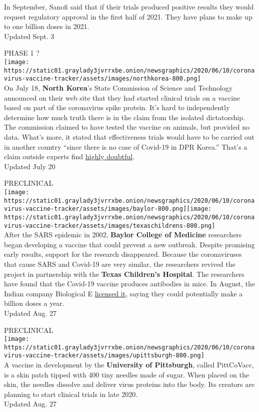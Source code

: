 In September, Sanofi said that if their trials produced positive results
they would request regulatory approval in the first half of 2021. They
have plans to make up to one billion doses in 2021.\\
Updated Sept. 3

PHASE 1 ?\\
\texttt{[image: https://static01.graylady3jvrrxbe.onion/newsgraphics/2020/06/10/coronavirus-vaccine-tracker/assets/images/northkorea-800.png]}\\
On July 18, \textbf{North Korea}'s State Commission of Science and
Technology announced on their web site that they had started clinical
trials on a vaccine based on part of the coronavirus spike protein. It's
hard to independently determine how much truth there is in the claim
from the isolated dictatorship. The commission claimed to have tested
the vaccine on animals, but provided no data. What's more, it stated
that effectiveness trials would have to be carried out in another
country ``since there is no case of Covid-19 in DPR Korea.'' That's a
claim outside experts find
\href{https://www.nytimes3xbfgragh.onion/2020/03/31/world/asia/north-korea-coronavirus.html}{highly
doubtful}.\\
Updated July 20

PRECLINICAL\\
\texttt{[image: https://static01.graylady3jvrrxbe.onion/newsgraphics/2020/06/10/coronavirus-vaccine-tracker/assets/images/baylor-800.png]}\texttt{[image: https://static01.graylady3jvrrxbe.onion/newsgraphics/2020/06/10/coronavirus-vaccine-tracker/assets/images/texaschildrens-800.png]}\\
After the SARS epidemic in 2002, \textbf{Baylor College of Medicine}
researchers began developing a vaccine that could prevent a new
outbreak. Despite promising early results, support for the research
disappeared. Because the coronaviruses that cause SARS and Covid-19 are
very similar, the researchers revived the project in partnership with
the \textbf{Texas Children's Hospital}. The researchers have found that
the Covid-19 vaccine produces antibodies in mice. In August, the Indian
company Biological E
\href{http://www.biologicale.com/news.html}{licensed it}, saying they
could potentially make a billion doses a year.\\
Updated Aug. 27

PRECLINICAL\\
\texttt{[image: https://static01.graylady3jvrrxbe.onion/newsgraphics/2020/06/10/coronavirus-vaccine-tracker/assets/images/upittsburgh-800.png]}\\
A vaccine in development by the \textbf{University of Pittsburgh},
called PittCoVacc, is a skin patch tipped with 400 tiny needles made of
sugar. When placed on the skin, the needles dissolve and deliver virus
proteins into the body. Its creators are planning to start clinical
trials in late 2020.\\
Updated Aug. 27

